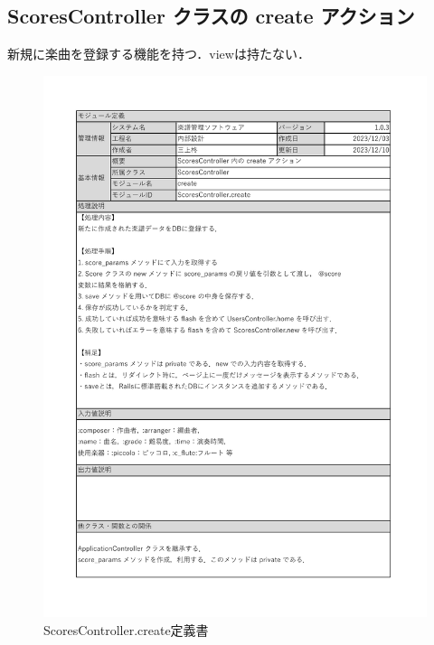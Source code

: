 \subsection*{ScoresController クラスの create アクション}
新規に楽曲を登録する機能を持つ．viewは持たない．
\begin{figure}[H]
	\centering
	\includegraphics[scale=0.6]{img/Scores/xlsx/ScoresController_create.pdf}
	\vspace{-1cm}
	\caption{ScoresController.create定義書}
\end{figure}
